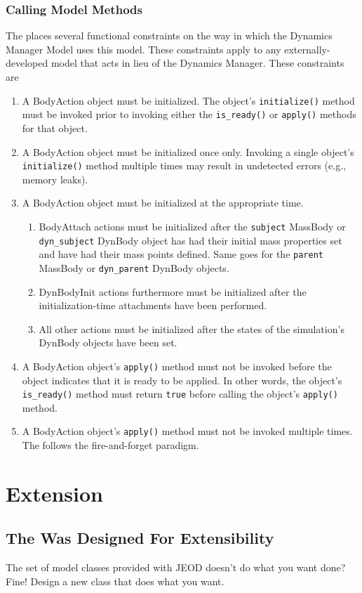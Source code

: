 \subsubsection{Calling Model Methods}
The \ModelDesc places several functional constraints on the way in
which the Dynamics Manager Model uses this model.
These constraints apply to any externally-developed model that
acts in lieu of the Dynamics Manager. These constraints are
\begin{enumerate}
\item A BodyAction object must be initialized.
The object's {\tt initialize()} method must be invoked prior to invoking
either the {\tt is\_ready()} or {\tt apply()} methods for that object.
\item A BodyAction object must be initialized once only.
Invoking a single object's {\tt initialize()} method multiple times may
result in undetected errors (e.g., memory leaks).
\item A BodyAction object must be initialized at the appropriate time.
\begin{enumerate}
\item BodyAttach actions must be initialized
after the {\tt subject} MassBody or {\tt dyn\_subject} DynBody object has had their initial mass properties set
and have had their mass points defined.
Same goes for the {\tt parent} MassBody or {\tt dyn\_parent} DynBody objects.
\item  DynBodyInit actions furthermore must be initialized after
the initialization-time attachments have been performed.
\item All other actions must be initialized after the states of the
simulation's DynBody objects have been set.
\end{enumerate}
\item A BodyAction object's {\tt apply()} method must not be invoked
before the object indicates that it is ready to be applied. In other words,
the object's {\tt is\_ready()} method must return {\tt true} before
calling the object's {\tt apply()} method.
\item A BodyAction object's {\tt apply()} method must not be invoked
multiple times. The \ModelDesc follows the fire-and-forget paradigm.
\end{enumerate}


\section{Extension}
\subsection{The \ModelDesc Was Designed For Extensibility}
The set of model classes provided with JEOD doesn't do what you want done?
Fine! Design a new class that does what you want.

